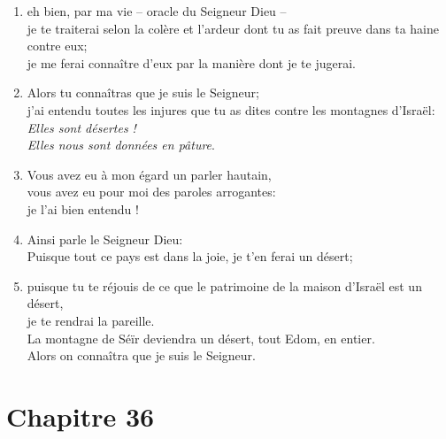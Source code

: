 \documentclass[12pt,a4paper,titlepage]{article}
\def \pslabelsep{0.2em} %
\def \psleftmargin{0em} %
\begin{document}
\begin{enumerate}[leftmargin=\psleftmargin, labelsep = \pslabelsep, label={\arabic*}, font=\color{\pscolor}\small\textsuperscript, parsep=0em, itemsep=0em, topsep=0em ]
\item eh bien, par ma vie – oracle du Seigneur Dieu – \\
je te traiterai selon la colère et l’ardeur dont tu as fait preuve dans ta haine contre eux; \\ je me ferai connaître d’eux par la manière dont je te jugerai.
\item Alors tu connaîtras que je suis le Seigneur; \\ j’ai entendu toutes les injures que tu as dites contre les montagnes d’Israël: \\ \decalage \og{}\emph{Elles sont désertes ! \\ \decalage Elles nous sont données en pâture}.\fg{}
\item Vous avez eu à mon égard un parler hautain, \\ vous avez eu pour moi des paroles arrogantes: \\ je l’ai bien entendu ! \parSpace
\item Ainsi parle le Seigneur Dieu: \\ Puisque tout ce pays est dans la joie, je t’en ferai un désert;
\item puisque tu te réjouis de ce que le patrimoine de la maison d’Israël est un désert, \\ je te rendrai la pareille. \\ La montagne de Séïr deviendra un désert, tout Edom, en entier. \\ Alors on connaîtra que je suis le Seigneur.
\end{enumerate}
\newpage

\section*{Chapitre 36}
\end{document}
